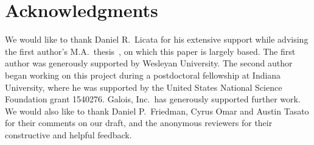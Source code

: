 \documentclass[sigplan, screen]{acmart}
\begin{document}
\section*{Acknowledgments}

We would like to thank Daniel R.\ Licata for his extensive support
while advising the first author's M.A.\
thesis~\citep{editTimeTactics}, on which this paper is largely based.
The first author was generously supported by Wesleyan University.  The
second author began working on this project during a postdoctoral fellowship at
Indiana University, where he was supported by the United States
National Science Foundation grant 1540276. Galois, Inc.\ has
generously supported further work.
We would also like to thank Daniel P.\ Friedman, Cyrus Omar and Austin Tasato for their
comments on our draft, and the anonymous reviewers for their constructive and helpful feedback.




\end{document}
